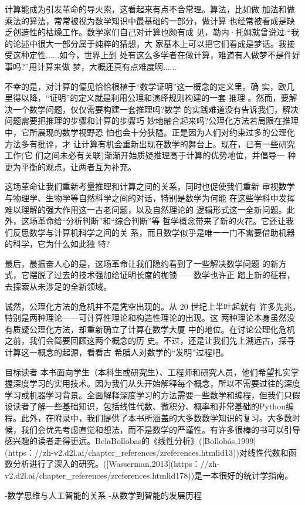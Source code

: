 计算能成为引发革命的导火索，这看起来有点不合常理。算法，比如做 加法和做乘法的算法，常常被视为数学知识中最基础的一部分，做计算 也经常被看成是缺乏创造性的枯燥工作。数学家们自己对计算也颇有成 见，勒内·托姆就曾说过:“我的论述中很大一部分属于纯粹的猜想，大 家基本上可以把它们看成是梦话。我接受这种定性......如今，世界上到 处有这么多学者在做计算，难道有人做梦不是件好事吗?”用计算来做 梦，大概还真有点难度啊......

不幸的是，对计算的偏见恰恰根植于“数学证明”这一概念的定义里。确 实，欧几里得以降，“证明”的定义就是利用公理和演绎规则构建的一套 推理 。然而，要解决一个数学问题，仅仅需要构建一套推理吗?数学 的实践难道没有告诉我们，解决问题需要把推理的步骤和计算的步骤巧 妙地融合起来吗?公理化方法若局限在推理中，它所展现的数学视野恐 怕也会十分狭隘。正是因为人们对约束过多的公理化方法多有批评，才 让计算有机会重新出现在数学的舞台上。现在，已有一些研究工作(它 们之间未必有关联)渐渐开始质疑推理高于计算的优势地位，并倡导一 种更为平衡的观点，让两者互为补充。

这场革命让我们重新考量推理和计算之间的关系，同时也促使我们重新 审视数学与物理学、生物学等自然科学之间的对话，特别是数学为何能 在这些学科中发挥难以理解的强大作用这一古老问题，以及自然理论的 逻辑形式这一全新问题。此外，这场革命给“分析判断”和“综合判断”等 哲学概念带来了新的火花。它还让我们反思数学与计算机科学之间的关 系，而且数学似乎是唯一一门不需要借助机器的科学，它为什么如此独 特?

最后，最振奋人心的是，这场革命让我们隐约看到了一些解决数学问题 的新方式，它摆脱了过去的技术强加给证明长度的枷锁——数学也许正 踏上新的征程，去探索从未涉足的全新领域。

诚然，公理化方法的危机并不是凭空出现的。从 20 世纪上半叶起就有 许多先兆，特别是两种理论——可计算性理论和构造性理论的出现。这 两种理论本身虽然没有质疑公理化方法，却重新确立了计算在数学大厦 中的地位。在讨论公理化危机之前，我们会简要回顾这两个概念的历 史。不过，还是让我们先上溯远古，探寻计算这一概念的起源，看看古 希腊人对数学的“发明”过程吧。


目标读者
本书面向学生（本科生或研究生）、工程师和研究人员，他们希望扎实掌握深度学习的实用技术。因为我们从头开始解释每个概念，所以不需要过往的深度学习或机器学习背景。全面解释深度学习的方法需要一些数学和编程，但我们只假设读者了解一些基础知识，包括线性代数、微积分、概率和非常基础的Python编程。此外，在附录中，我们提供了本书所涵盖的大多数数学知识的复习。大多数时候，我们会优先考虑直觉和想法，而不是数学的严谨性。有许多很棒的书可以引导感兴趣的读者走得更远。BelaBollobas的《线性分析》([Bollobás,1999](https：//zh-v2.d2l.ai/chapter\_references/zreferences.htmlid13))对线性代数和函数分析进行了深入的研究。([Wasserman,2013](https：//zh-v2.d2l.ai/chapter\_references/zreferences.htmlid178))是一本很好的统计学指南。


-数学思维与人工智能的关系
-从数学到智能的发展历程


\newpage